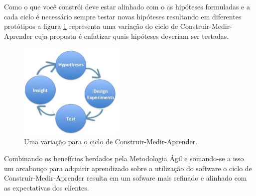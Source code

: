 \par Como o que você constrói deve estar alinhado com o as hipóteses formuladas e a cada ciclo é necessário sempre testar novas hipóteses resultando em diferentes protótipos a figura \ref{fig:hypotheses-experiment} representa uma variação do ciclo de Construir-Medir-Aprender cuja proposta é enfatizar quais hipóteses deveriam ser testadas.
\begin{figure}[htb]
\centering
\includegraphics[width=5cm]{figuras/hypotheses-experiment}
\caption{\label{fig:hypotheses-experiment} Uma variação para o ciclo de Construir-Medir-Aprender.}	
\end{figure}
\par Combinando os benefícios herdados pela Metodologia Ágil e somando-se a isso um arcabouço para adquirir aprendizado sobre a utilização do software o ciclo de Construir-Medir-Aprender resulta em um sofware mais refinado e alinhado com as expectativas dos clientes.

